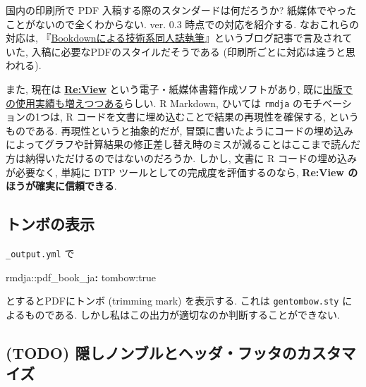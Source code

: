 \documentclass[
  xelatex,ja=standard,jafont=noto]{bxjsbook}
\newenvironment{Shaded}{\begin{snugshade}}{\end{snugshade}}
\newcommand{\AttributeTok}[1]{\textcolor[rgb]{0.77,0.63,0.00}{#1}}
\newcommand{\FunctionTok}[1]{\textcolor[rgb]{0.00,0.00,0.00}{#1}}
\newcommand{\KeywordTok}[1]{\textcolor[rgb]{0.13,0.29,0.53}{\textbf{#1}}}
\theoremstyle{definition}
\theoremstyle{definition}
\theoremstyle{definition}
\theoremstyle{definition}
\theoremstyle{remark}
\begin{document}
国内の印刷所で PDF 入稿する際のスタンダードは何だろうか?
紙媒体でやったことがないので全くわからない. ver. 0.3
時点での対応を紹介する. なおこれらの対応は,
『\href{https://teastat.blogspot.com/2019/01/bookdown.html}{Bookdownによる技術系同人誌執筆}』というブログ記事で言及されていた,
入稿に必要なPDFのスタイルだそうである
(印刷所ごとに対応は違うと思われる).

また, 現在は \href{https://reviewml.org/ja/}{\textbf{Re:View}}
という電子・紙媒体書籍作成ソフトがあり,
既に\href{https://github.com/kmuto/review/wiki/\%E5\%88\%A9\%E7\%94\%A8\%E5\%AE\%9F\%E7\%B8\%BE}{出版での使用実績も増えつつある}らしい.
R Markdown, ひいては \texttt{rmdja} のモチベーションの1つは, R
コードを文書に埋め込むことで結果の再現性を確保する, というものである.
再現性というと抽象的だが,
冒頭に書いたようにコードの埋め込みによってグラフや計算結果の修正差し替え時のミスが減ることはここまで読んだ方は納得いただけるのではないのだろうか.
しかし, 文書に R コードの埋め込みが必要なく, 単純に DTP
ツールとしての完成度を評価するのなら, \textbf{Re:View
のほうが確実に信頼できる}.

\hypertarget{ux30c8ux30f3ux30dcux306eux8868ux793a}{%
\subsection{トンボの表示}\label{ux30c8ux30f3ux30dcux306eux8868ux793a}}

\texttt{\_output.yml} で

\begin{Shaded}
\begin{Highlighting}[]
\AttributeTok{rmdja:}\FunctionTok{:pdf\_book\_ja}\KeywordTok{:}
\AttributeTok{  tombow:true}
\end{Highlighting}
\end{Shaded}

とするとPDFにトンボ (trimming mark) を表示する. これは
\texttt{gentombow.sty} によるものである.
しかし私はこの出力が適切なのか判断することができない.

\hypertarget{todo-ux96a0ux3057ux30ceux30f3ux30d6ux30ebux3068ux30d8ux30c3ux30c0ux30d5ux30c3ux30bfux306eux30abux30b9ux30bfux30deux30a4ux30ba}{%
\subsection{(TODO)
隠しノンブルとヘッダ・フッタのカスタマイズ}\label{todo-ux96a0ux3057ux30ceux30f3ux30d6ux30ebux3068ux30d8ux30c3ux30c0ux30d5ux30c3ux30bfux306eux30abux30b9ux30bfux30deux30a4ux30ba}}
\end{document}
